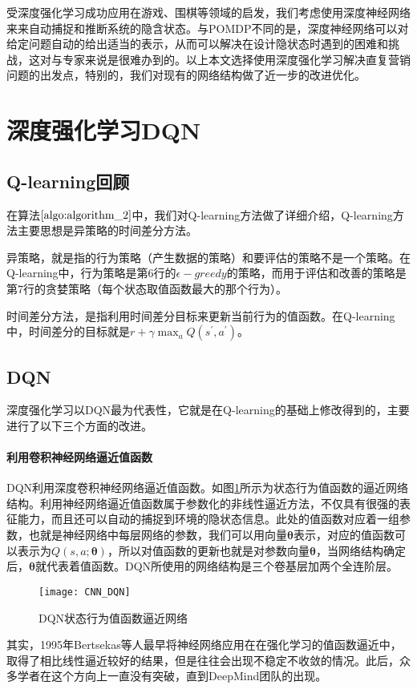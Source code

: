 受深度强化学习成功应用在游戏、围棋等领域的启发，我们考虑使用深度神经网络来来自动捕捉和推断系统的隐含状态。与POMDP不同的是，深度神经网络可以对给定问题自动的给出适当的表示，从而可以解决在设计隐状态时遇到的困难和挑战，这对与专家来说是很难办到的。以上本文选择使用深度强化学习解决直复营销问题的出发点，特别的，我们对现有的网络结构做了近一步的改进优化。

\section{深度强化学习DQN}
\subsection{Q-learning回顾}
在算法$\ref{algo:algorithm_2}$中，我们对Q-learning方法做了详细介绍，Q-learning方法主要思想是异策略的时间差分方法。

异策略，就是指的行为策略（产生数据的策略）和要评估的策略不是一个策略。在Q-learning中，行为策略是第6行的$\epsilon-greedy$的策略，而用于评估和改善的策略是第7行的贪婪策略（每个状态取值函数最大的那个行为）。

时间差分方法，是指利用时间差分目标来更新当前行为的值函数。在Q-learning中，时间差分的目标就是$r+\gamma \max_{a} Q(s^{'},a^{'})$。
\subsection{DQN}
 深度强化学习以DQN最为代表性，它就是在Q-learning的基础上修改得到的，主要进行了以下三个方面的改进。

 \paragraph{利用卷积神经网络逼近值函数}
 DQN利用深度卷积神经网络逼近值函数。如图\ref{fig:CNN_DQN}所示为状态行为值函数的逼近网络结构。利用神经网络逼近值函数属于参数化的非线性逼近方法，不仅具有很强的表征能力，而且还可以自动的捕捉到环境的隐状态信息。此处的值函数对应着一组参数，也就是神经网络中每层网络的参数，我们可以用向量$\mathbf{\theta}$表示，对应的值函数可以表示为$Q(s,a;\mathbf{\theta})$，所以对值函数的更新也就是对参数向量$\mathbf{\theta}$，当网络结构确定后，$\mathbf{\theta}$就代表着值函数。DQN所使用的网络结构是三个卷基层加两个全连阶层。
\begin{figure}[htbp]
\centering
\texttt{[image: CNN\_DQN]}
\caption{DQN状态行为值函数逼近网络}
\label{fig:CNN_DQN}
\end{figure}

其实，1995年Bertsekas等人最早将神经网络应用在在强化学习的值函数逼近中，取得了相比线性逼近较好的结果，但是往往会出现不稳定不收敛的情况\citep{bertsekas1995neuro}。此后，众多学者在这个方向上一直没有突破，直到DeepMind团队的出现。

